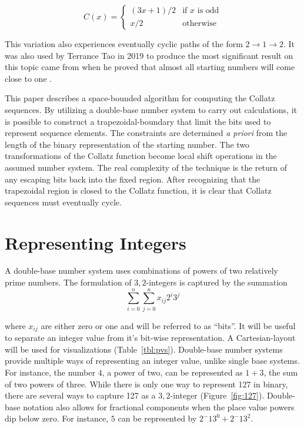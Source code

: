 \documentclass{article}
\begin{document}
\begin{equation}
  C(x) = \begin{cases}
    (3 x + 1) / 2 & \text{if } x \text{ is odd}\\
    x / 2 & \text{otherwise}
    \end{cases}
\end{equation}

This variation also experiences eventually cyclic paths of the form
$2\rightarrow1\rightarrow2$.  It was also used by Terrance Tao in 2019 to
produce the most significant result on this topic came from when he proved that
almost all starting numbers will come close to one \cite{tao2022}.

This paper describes a space-bounded algorithm for computing the Collatz
sequences.  By utilizing a double-base number system to carry out calculations,
it is possible to construct a trapezoidal-boundary that limit the bits used to
represent sequence elements.  The constraints are determined \emph{a priori}
from the length of the binary representation of the starting number. The two
transformations of the Collatz function become local shift operations in the
assumed number system. The real complexity of the technique is the return of
any escaping bits back into the fixed region.  After recognizing that the
trapezoidal region is closed to the Collatz function, it is clear that Collatz
sequences must eventually cycle.

\section{Representing Integers}

A double-base number system uses combinations of powers of two relatively prime
numbers\cite{dimitrov2017}.
The formulation of ${3,2}$-integers is captured by the summation
\begin{equation}
  \sum_{i=0}^n \sum_{j=0}^n x_{ij} 2^i3^j
\end{equation}

where $x_{ij}$ are either zero or one and will be referred to as ``bits''. It
will be useful to separate an integer value from it's bit-wise
representation. A Cartesian-layout will be used for visualizations (Table~\ref{tbl:pvs}).
Double-base number systems provide multiple ways of
representing an integer value, unlike single base systems. For instance, the
number $4$, a power of two, can be represented as $1+3$, the sum of two powers
of three. While there is only one way to represent 127 in binary, there are
several ways to capture 127 as a ${3,2}$-integer (Figure~\ref{fig:127}). Double-base
notation also allows for fractional components when the place value powers dip below
zero. For instance, $5$ can be represented by $2^-13^0+2^-13^2$.
\end{document}
